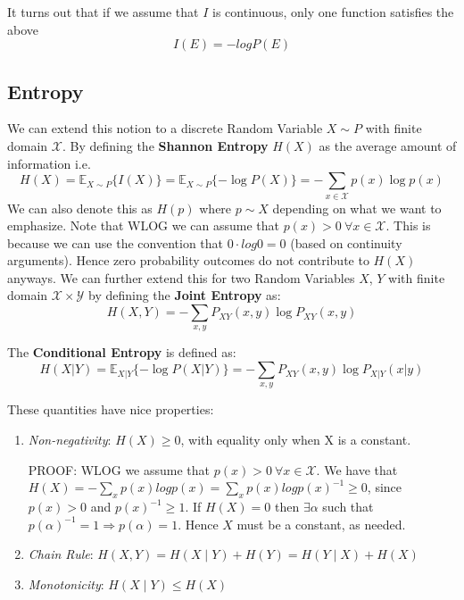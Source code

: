 \documentclass[]{article}
\begin{document}
It turns out that if we assume that $I$ is continuous, only one function satisfies the above \cite{EntNotes}
\begin{equation}
I(E) = -log P(E)
\end{equation}


\subsection{Entropy}
We can extend this notion to a discrete Random Variable $X\sim P$ with finite domain $\mathcal{X}$. By defining the \textbf{Shannon Entropy} $H(X)$ as the average amount of information i.e. 
\begin{equation}
H(X) = \mathbb{E}_{X\sim P}\{I(X)\} = \mathbb{E}_{X\sim P}\{-\log P(X)\} = -\sum_{x\in\mathcal{X}}p(x)\log p(x)
\end{equation}
We can also denote this as $H(p)$ where $p \sim X$ depending on what we want to emphasize. Note that WLOG we can assume that \(p(x)>0 \ \forall x\in\mathcal{X}\). This is because we can use the convention that \(0\cdot log0 = 0\) (based on continuity arguments). Hence zero probability outcomes do not contribute to $H(X)$ anyways. We can further extend this for two Random Variables $X$, $Y$ with finite domain \(\mathcal{X}\times\mathcal{Y}\) by defining the \textbf{Joint Entropy} as:
\begin{equation}
H(X,Y) = -\sum_{x,y}P_{XY}(x,y)\log P_{XY}(x,y)
\end{equation}

The \textbf{Conditional Entropy} is defined as:
\begin{equation}
H(X|Y) = \mathbb{E}_{X|Y}\{-\log P(X|Y)\} = -\sum_{x,y}P_{XY}(x,y)\log P_{X|Y}(x|y)
\end{equation}

These quantities have nice properties:
\begin{enumerate}
	\item \emph{Non-negativity}: \(H(X)\ge0\), with equality only when X is a constant.
	
	PROOF: WLOG we assume that \(p(x)>0 \ \forall x\in\mathcal{X}\). We have that \(H(X) = -\sum_{x} p(x)logp(x) = \sum_{x} p(x)logp(x)^{-1}\ge0\), since \(p(x)>0\) and \(p(x)^{-1} \ge 1\). If \(H(X)=0\) then \(\exists \alpha\) such that \(p(\alpha)^{-1}=1 \Rightarrow p(\alpha)=1\). Hence \(X\) must be a constant, as needed.
	
	\item \emph{Chain Rule}: $H(X,Y) = H(X \mid Y) + H(Y) = H(Y \mid X) + H(X)$ 
	\item \emph{Monotonicity}: $H(X\mid Y) \le H(X)$ 
\end{enumerate}
\end{document}

